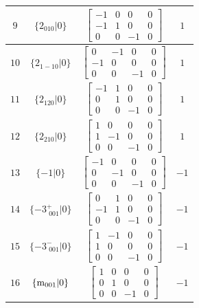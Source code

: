 \documentclass[fleqn,8pt]{jsarticle}
\begin{document}
\begin{longtable}{cccc}
$ 9 $ & $ \{2{}_{010}|0\} $ & $ \begin{bmatrix} -1 & 0 & 0 & 0 \\ -1 & 1 & 0 & 0 \\ 0 & 0 & -1 & 0 \end{bmatrix} $ & $ 1 $ \\ \hline
$ 10 $ & $ \{2{}_{1-10}|0\} $ & $ \begin{bmatrix} 0 & -1 & 0 & 0 \\ -1 & 0 & 0 & 0 \\ 0 & 0 & -1 & 0 \end{bmatrix} $ & $ 1 $ \\ \hline
$ 11 $ & $ \{2{}_{120}|0\} $ & $ \begin{bmatrix} -1 & 1 & 0 & 0 \\ 0 & 1 & 0 & 0 \\ 0 & 0 & -1 & 0 \end{bmatrix} $ & $ 1 $ \\ \hline
$ 12 $ & $ \{2{}_{210}|0\} $ & $ \begin{bmatrix} 1 & 0 & 0 & 0 \\ 1 & -1 & 0 & 0 \\ 0 & 0 & -1 & 0 \end{bmatrix} $ & $ 1 $ \\ \hline
$ 13 $ & $ \{-1|0\} $ & $ \begin{bmatrix} -1 & 0 & 0 & 0 \\ 0 & -1 & 0 & 0 \\ 0 & 0 & -1 & 0 \end{bmatrix} $ & $ -1 $ \\ \hline
$ 14 $ & $ \{-3^{+}_{\,\,001}|0\} $ & $ \begin{bmatrix} 0 & 1 & 0 & 0 \\ -1 & 1 & 0 & 0 \\ 0 & 0 & -1 & 0 \end{bmatrix} $ & $ -1 $ \\ \hline
$ 15 $ & $ \{-3^{-}_{\,\,001}|0\} $ & $ \begin{bmatrix} 1 & -1 & 0 & 0 \\ 1 & 0 & 0 & 0 \\ 0 & 0 & -1 & 0 \end{bmatrix} $ & $ -1 $ \\ \hline
$ 16 $ & $ \{{\rm m}_{001}|0\} $ & $ \begin{bmatrix} 1 & 0 & 0 & 0 \\ 0 & 1 & 0 & 0 \\ 0 & 0 & -1 & 0 \end{bmatrix} $ & $ -1 $ \\ \hline

\end{longtable}
\end{document}
